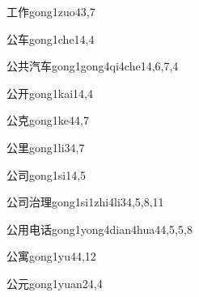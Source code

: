 \begin{verbete}{工作}{gong1zuo4}{3,7}
\end{verbete}

\begin{verbete}{公车}{gong1che1}{4,4}
\end{verbete}

\begin{verbete}{公共汽车}{gong1gong4qi4che1}{4,6,7,4}
\end{verbete}

\begin{verbete}{公开}{gong1kai1}{4,4}
\end{verbete}

\begin{verbete}{公克}{gong1ke4}{4,7}
\end{verbete}

\begin{verbete}{公里}{gong1li3}{4,7}
\end{verbete}

\begin{verbete}{公司}{gong1si1}{4,5}
\end{verbete}

\begin{verbete}{公司治理}{gong1si1zhi4li3}{4,5,8,11}
\end{verbete}

\begin{verbete}{公用电话}{gong1yong4dian4hua4}{4,5,5,8}
\end{verbete}

\begin{verbete}{公寓}{gong1yu4}{4,12}
\end{verbete}

\begin{verbete}{公元}{gong1yuan2}{4,4}
\end{verbete}

